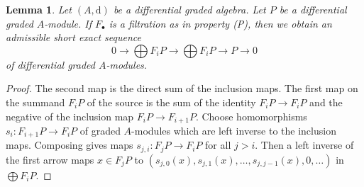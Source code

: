 \documentclass{stacks-project}
\theoremstyle{plain}
\newtheorem{lemma}[subsection]{Lemma}
\theoremstyle{definition}
\theoremstyle{remark}
\numberwithin{equation}{subsection}
\begin{document}
\begin{lemma}
\label{lemma-property-P-sequence}
Let $(A, \text{d})$ be a differential graded algebra.
Let $P$ be a differential graded $A$-module. If $F_\bullet$
is a filtration as in property (P), then we obtain an
admissible short exact sequence
$$
0 \to
\bigoplus\nolimits F_iP \to
\bigoplus\nolimits F_iP \to P \to 0
$$
of differential graded $A$-modules.
\end{lemma}

\begin{proof}
The second map is the direct sum of the inclusion maps.
The first map on the summand $F_iP$ of the source is the sum
of the identity $F_iP \to F_iP$ and the negative of the inclusion
map $F_iP \to F_{i + 1}P$. Choose homomorphisms $s_i : F_{i + 1}P \to F_iP$
of graded $A$-modules which are left inverse to the inclusion maps.
Composing gives maps $s_{j, i} : F_jP \to F_iP$ for all $j > i$.
Then a left inverse of the first arrow maps $x \in F_jP$ to
$(s_{j, 0}(x), s_{j, 1}(x), \ldots, s_{j, j - 1}(x), 0, \ldots)$
in $\bigoplus F_iP$.
\end{proof}
\end{document}
